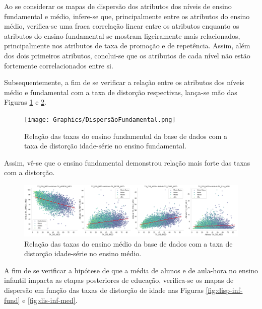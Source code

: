 \par Ao se considerar os mapas de dispersão dos atributos dos níveis de ensino fundamental e médio, infere-se que, principalmente entre os atributos do ensino médio, verifica-se uma fraca correlação linear entre os atributos enquanto os atributos do ensino fundamental se mostram ligeiramente mais relacionados, principalmente nos atributos de taxa de promoção e de repetência. Assim, além dos dois primeiros atributos, conclui-se que os atributos de cada nível não estão fortemente correlacionados entre si.

\par Subsequentemente, a fim de se verificar a relação entre os atributos dos níveis médio e fundamental com a taxa de distorção respectivas, lança-se mão das Figuras \ref{fig:disp-fund} e \ref{fig:disp-med}.

\begin{figure}[H]
    \centering
    \texttt{[image: Graphics/DispersãoFundamental.png]}
    \caption{Relação das taxas do ensino fundamental da base de dados com a taxa de distorção idade-série no ensino fundamental.}
    \label{fig:disp-fund}
\end{figure}

\par Assim, vê-se que o ensino fundamental demonstrou relação mais forte das taxas com a distorção.

\begin{figure}[H]
    \centering
    \includegraphics[scale = 0.28]{Graphics/Dispersão médio.png}
    \caption{Relação das taxas do ensino médio da base de dados com a taxa de distorção idade-série no ensino médio.}
    \label{fig:disp-med}
\end{figure}

\par A fim de se verificar a hipótese de que a média de alunos e de aula-hora no ensino infantil impacta as etapas posteriores de educação, verifica-se os mapas de dispersão em função das taxas de distorção de idade nas Figuras \ref{fig:disp-inf-fund} e \ref{fig:dis-inf-med}.

